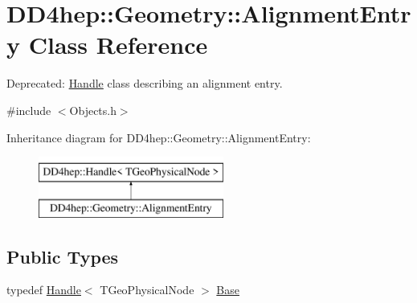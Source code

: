 \hypertarget{class_d_d4hep_1_1_geometry_1_1_alignment_entry}{}\section{D\+D4hep\+:\+:Geometry\+:\+:Alignment\+Entry Class Reference}
\label{class_d_d4hep_1_1_geometry_1_1_alignment_entry}


Deprecated\+: \hyperlink{class_d_d4hep_1_1_handle}{Handle} class describing an alignment entry.  




{\ttfamily \#include $<$Objects.\+h$>$}

Inheritance diagram for D\+D4hep\+:\+:Geometry\+:\+:Alignment\+Entry\+:\begin{figure}[H]
\begin{center}
\leavevmode
\includegraphics[height=2.000000cm]{class_d_d4hep_1_1_geometry_1_1_alignment_entry}
\end{center}
\end{figure}
\subsection*{Public Types}
\begin{DoxyCompactItemize}
\item 
typedef \hyperlink{class_d_d4hep_1_1_handle}{Handle}$<$ T\+Geo\+Physical\+Node $>$ \hyperlink{class_d_d4hep_1_1_geometry_1_1_alignment_entry_a5292caf0fb24d8750c2c24ef8f69a258}{Base}
\end{DoxyCompactItemize}
